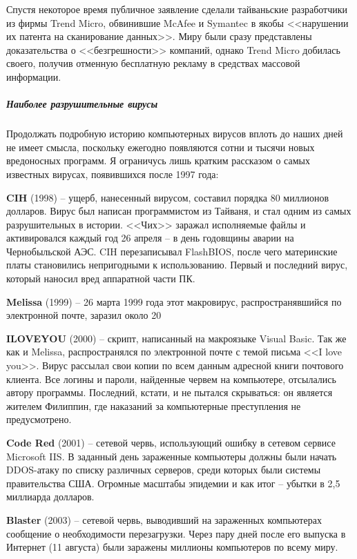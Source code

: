 Спустя некоторое время публичное заявление сделали тайваньские разработчики
из фирмы Trend Micro, обвинившие McAfee и Symantec в якобы <<нарушении их
патента на сканирование данных>>. Миру были сразу представлены доказательства
о <<безгрешности>> компаний, однако Trend Micro добилась своего, получив
отменную бесплатную рекламу в средствах массовой информации.
%
\subparagraph{Наиболее разрушительные вирусы}
%
Продолжать подробную историю компьютерных вирусов вплоть до наших дней не
имеет смысла, поскольку ежегодно появляются сотни и тысячи новых вредоносных
программ. Я ограничусь лишь кратким рассказом о самых известных вирусах,
появившихся после 1997 года:

\textbf{CIH} (1998) -- ущерб, нанесенный вирусом, составил порядка 80
миллионов долларов. Вирус был написан программистом из Тайваня, и стал одним
из самых разрушительных в истории. <<Чих>> заражал исполняемые файлы и
активировался каждый год 26 апреля – в день годовщины аварии на Чернобыльской
АЭС. CIH перезаписывал FlashBIOS, после чего материнские платы становились
непригодными к использованию. Первый и последний вирус, который наносил вред
аппаратной части ПК.

\textbf{Melissa} (1999) -- 26 марта 1999 года этот макровирус, распространявшийся по электронной почте, заразил около 20%

\textbf{ILOVEYOU} (2000) -- скрипт, написанный на макроязыке Visual Basic.
Так же как и Melissa, распространялся по электронной почте с темой письма <<I
love you>>. Вирус рассылал свои копии по всем данным адресной книги почтового
клиента. Все логины и пароли, найденные червем на компьютере, отсылались
автору программы. Последний, кстати, и не пытался скрываться: он является
жителем Филиппин, где наказаний за компьютерные преступления не
предусмотрено.

\textbf{Code Red} (2001) -- сетевой червь, использующий ошибку в сетевом
сервисе Microsoft IIS. В заданный день зараженные компьютеры должны были
начать DDOS-атаку по списку различных серверов, среди которых были системы
правительства США. Огромные масштабы эпидемии и как итог – убытки в 2,5
миллиарда долларов.

\textbf{Blaster} (2003) -- сетевой червь, выводивший на зараженных
компьютерах сообщение о необходимости перезагрузки. Через пару дней после его
выпуска в Интернет (11 августа) были заражены миллионы компьютеров по всему
миру.


